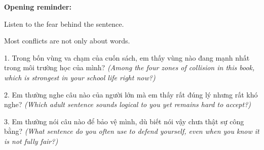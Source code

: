 \begin{ghinhoanh}
\textbf{Opening reminder:}

Listen to the fear behind the sentence.

Most conflicts are not only about words.
\end{ghinhoanh}

\begin{tuhocnhanh}
1. Trong bốn vùng va chạm của cuốn sách, em thấy vùng nào đang mạnh nhất trong môi trường học của mình? \textit{(Among the four zones of collision in this book, which is strongest in your school life right now?)}

2. Em thường nghe câu nào của người lớn mà em thấy rất đúng lý nhưng rất khó nghe? \textit{(Which adult sentence sounds logical to you yet remains hard to accept?)}

3. Em thường nói câu nào để bảo vệ mình, dù biết nói vậy chưa thật sự công bằng? \textit{(What sentence do you often use to defend yourself, even when you know it is not fully fair?)}
\end{tuhocnhanh}
\ngancach